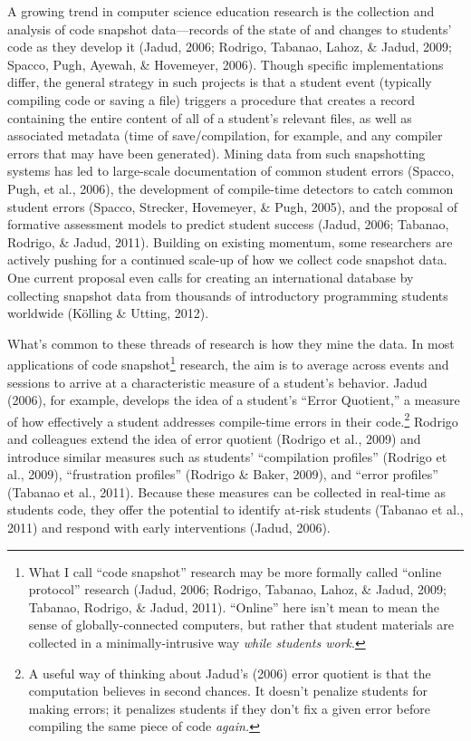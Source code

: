 A growing trend in computer science education research is the collection
and analysis of code snapshot data---records of the state of and changes
to students' code as they develop it (Jadud, 2006; Rodrigo, Tabanao,
Lahoz, \& Jadud, 2009; Spacco, Pugh, Ayewah, \& Hovemeyer, 2006). Though
specific implementations differ, the general strategy in such projects
is that a student event (typically compiling code or saving a file)
triggers a procedure that creates a record containing the entire content
of all of a student's relevant files, as well as associated metadata
(time of save/compilation, for example, and any compiler errors that may
have been generated). Mining data from such snapshotting systems has led
to large-scale documentation of common student errors (Spacco, Pugh, et
al., 2006), the development of compile-time detectors to catch common
student errors (Spacco, Strecker, Hovemeyer, \& Pugh, 2005), and the
proposal of formative assessment models to predict student success
(Jadud, 2006; Tabanao, Rodrigo, \& Jadud, 2011). Building on existing
momentum, some researchers are actively pushing for a continued scale-up
of how we collect code snapshot data. One current proposal even calls
for creating an international database by collecting snapshot data from
thousands of introductory programming students worldwide (Kölling \&
Utting, 2012).

What's common to these threads of research is how they mine the data. In
most applications of code snapshot\footnote{What I call ``code
  snapshot'' research may be more formally called ``online protocol''
  research (Jadud, 2006; Rodrigo, Tabanao, Lahoz, \& Jadud, 2009;
  Tabanao, Rodrigo, \& Jadud, 2011). ``Online'' here isn't mean to mean
  the sense of globally-connected computers, but rather that student
  materials are collected in a minimally-intrusive way \emph{while
  students work}.} research, the aim is to average across events and
sessions to arrive at a characteristic measure of a student's behavior.
Jadud (2006), for example, develops the idea of a student's ``Error
Quotient,'' a measure of how effectively a student addresses
compile-time errors in their code.\footnote{A useful way of thinking
  about Jadud's (2006) error quotient is that the computation believes
  in second chances. It doesn't penalize students for making errors; it
  penalizes students if they don't fix a given error before compiling
  the same piece of code \emph{again.}} Rodrigo and colleagues extend
the idea of error quotient (Rodrigo et al., 2009) and introduce similar
measures such as students' ``compilation profiles'' (Rodrigo et al.,
2009), ``frustration profiles'' (Rodrigo \& Baker, 2009), and ``error
profiles'' (Tabanao et al., 2011). Because these measures can be
collected in real-time as students code, they offer the potential to
identify at-risk students (Tabanao et al., 2011) and respond with early
interventions (Jadud, 2006).

